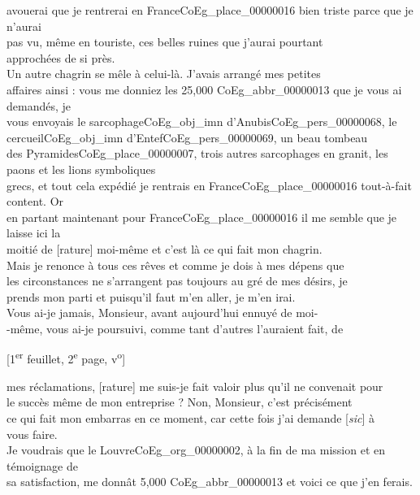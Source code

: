 \documentclass{book}
\begin{document}
avouerai que je rentrerai en France\gls{CoEg_place_00000016} bien triste parce que je n’aurai\\
pas vu, même en touriste, ces belles ruines que j’aurai pourtant\\
approchées de si près.\\
\indent Un autre chagrin se mêle à celui-là. J’avais arrangé mes petites\\
affaires ainsi : vous me donniez les 25,000 \gls{CoEg_abbr_00000013} que je vous ai demandés, je\\
vous envoyais le sarcophage\gls{CoEg_obj_imn} d’Anubis\gls{CoEg_pers_00000068}, le cercueil\gls{CoEg_obj_imn} d’Entef\gls{CoEg_pers_00000069}, un beau tombeau\\
des Pyramides\gls{CoEg_place_00000007}, trois autres sarcophages en granit, les paons et les lions symboliques\\
grecs, et tout cela expédié je rentrais en France\gls{CoEg_place_00000016} tout-à-fait content. Or\\
en partant maintenant pour France\gls{CoEg_place_00000016} il me semble que je laisse ici la\\
moitié de [rature] moi-même et c’est là ce qui fait mon chagrin.\\
\indent Mais je renonce à tous ces rêves et comme je dois à mes dépens que\\
les circonstances ne s’arrangent pas toujours au gré de mes désirs, je\\
prends mon parti et puisqu’il faut m’en aller, je m’en irai.\\
\indent Vous ai-je jamais, Monsieur, avant aujourd’hui ennuyé de moi-\\
-même, vous ai-je poursuivi, comme tant d’autres l’auraient fait, de
{\footnotesize\begin{center} {[1\textsuperscript{er} feuillet, 2\textsuperscript{e} page, v\textsuperscript{o}]}\end{center}}
\noindent mes réclamations, [rature] me suis-je fait valoir plus qu’il ne convenait pour\\
le succès même de mon entreprise ? Non, Monsieur, c’est précisément\\
ce qui fait mon embarras en ce moment, car cette fois j’ai demande {[\textit{sic}]} à\\
vous faire.\\
\indent Je voudrais que le Louvre\gls{CoEg_org_00000002}, à la fin de ma mission et en témoignage de\\
sa satisfaction, me donnât 5,000 \gls{CoEg_abbr_00000013} et voici ce que j’en ferais.\\
\end{document}
